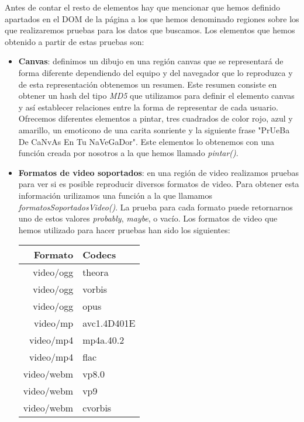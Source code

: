 \noindent  Antes de contar el resto de elementos hay que mencionar que hemos definido apartados en el DOM de la página a los que hemos denominado regiones sobre los que realizaremos pruebas para los datos que buscamos. Los elementos que hemos obtenido a partir de estas pruebas son:
\begin{itemize} 
    \item \textbf{Canvas}: definimos un dibujo en una región canvas que se representará de forma diferente dependiendo del equipo y del navegador que lo reproduzca y de esta representación obtenemos un resumen. Este resumen consiste en obtener un hash del tipo \textit{MD5} que utilizamos para definir el elemento canvas y así establecer relaciones entre la forma de representar de cada usuario. Ofrecemos diferentes elementos a pintar, tres cuadrados de color rojo, azul y amarillo, un emoticono de una carita sonriente y la siguiente frase "PrUeBa De CaNvAs En Tu NaVeGaDor". Este elementos lo obtenemos con una función creada por nosotros a la que hemos llamado \textit{pintar()}.
    \item \textbf{Formatos de video soportados}: en una región de video realizamos pruebas para ver si es posible reproducir diversos formatos de video. Para obtener esta información urilizamos una función a la que llamamos \textit{formatosSoportadosVideo()}. La prueba para cada formato puede retornarnos uno de estos valores \textit{probably}, \textit{maybe}, o vacío. Los formatos de video que hemos utilizado para hacer pruebas han sido los siguientes:
    \begin{table}[htbp]
        \begin{center}
            \begin{tabular}{ r | l }
            \textbf{Formato} & \textbf{Codecs} \\ \hline
            video/ogg & theora \\
            video/ogg & vorbis \\
            video/ogg & opus \\
            video/mp & avc1.4D401E \\
            video/mp4 & mp4a.40.2 \\
            video/mp4 & flac \\
            video/webm & vp8.0 \\
            video/webm & vp9 \\
            video/webm & cvorbis \\
            \end{tabular}
        \end{center}

\end{table}
\end{itemize}
